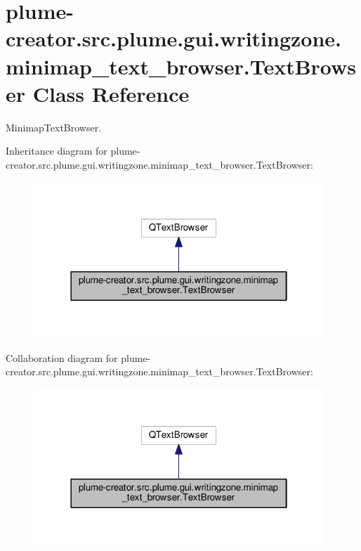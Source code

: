 \hypertarget{classplume-creator_1_1src_1_1plume_1_1gui_1_1writingzone_1_1minimap__text__browser_1_1_text_browser}{}\section{plume-\/creator.src.\+plume.\+gui.\+writingzone.\+minimap\+\_\+text\+\_\+browser.\+Text\+Browser Class Reference}
\label{classplume-creator_1_1src_1_1plume_1_1gui_1_1writingzone_1_1minimap__text__browser_1_1_text_browser}


Minimap\+Text\+Browser.  




Inheritance diagram for plume-\/creator.src.\+plume.\+gui.\+writingzone.\+minimap\+\_\+text\+\_\+browser.\+Text\+Browser\+:\nopagebreak
\begin{figure}[H]
\begin{center}
\leavevmode
\includegraphics[width=310pt]{classplume-creator_1_1src_1_1plume_1_1gui_1_1writingzone_1_1minimap__text__browser_1_1_text_browser__inherit__graph}
\end{center}
\end{figure}


Collaboration diagram for plume-\/creator.src.\+plume.\+gui.\+writingzone.\+minimap\+\_\+text\+\_\+browser.\+Text\+Browser\+:\nopagebreak
\begin{figure}[H]
\begin{center}
\leavevmode
\includegraphics[width=310pt]{classplume-creator_1_1src_1_1plume_1_1gui_1_1writingzone_1_1minimap__text__browser_1_1_text_browser__coll__graph}
\end{center}
\end{figure}
